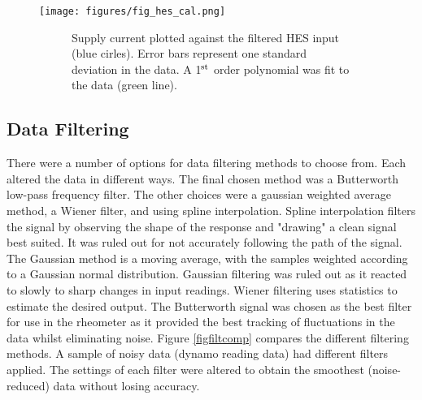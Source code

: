 \documentclass[twoside,a4]{report}
\def\br{\newline \newline \noindent}
\begin{document}
	\begin{figure}[!htb]
		\centering
		\texttt{[image: figures/fig\_hes\_cal.png]}
		\caption{Current Sensor Evaluation Results}
		\label{figcurevalres}
		\begin{subfigure}{0.9\textwidth}
			\footnotesize Supply current plotted against the filtered HES input (blue cirles). Error bars represent one standard deviation in the data. A 1$\rm ^{st}$ order polynomial was fit to the data (green line).
		\end{subfigure}
	\end{figure}
	
	\subsection*{Data Filtering}
	There were a number of options for data filtering methods to choose from. Each altered the data in different ways. The final chosen method was a Butterworth low-pass frequency filter. The other choices were a gaussian weighted average method, a Wiener filter, and using spline interpolation. Spline interpolation filters the signal by observing the shape of the response and "drawing" a clean signal best suited. It was ruled out for not accurately following the path of the signal. The Gaussian method is a moving average, with the samples weighted according to a Gaussian normal distribution. Gaussian filtering was ruled out as it reacted to slowly to sharp changes in input readings. Wiener filtering uses statistics to estimate the desired output. The Butterworth signal was chosen as the best filter for use in the rheometer as it provided the best tracking of fluctuations in the data whilst eliminating noise.
	\br
	Figure \ref{figfiltcomp} compares the different filtering methods. A sample of noisy data (dynamo reading data) had different filters applied. The settings of each filter were altered to obtain the smoothest (noise-reduced) data without losing accuracy.
	\newline
	
\end{document}
